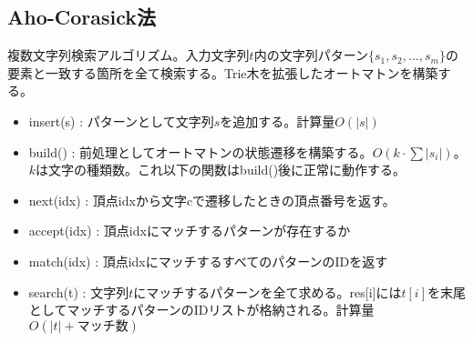 \subsection{Aho-Corasick法}

複数文字列検索アルゴリズム。入力文字列$t$内の文字列パターン$\{s_1, s_2, \ldots, s_m \}$の要素と一致する箇所を全て検索する。Trie木を拡張したオートマトンを構築する。

\begin{itemize}
    \item insert(s) : パターンとして文字列$s$を追加する。計算量$O(|s|)$
    \item build() : 前処理としてオートマトンの状態遷移を構築する。$O(k\cdot\sum{|s_i|})$。 $k$は文字の種類数。これ以下の関数はbuild()後に正常に動作する。
    \item next(idx) : 頂点idxから文字cで遷移したときの頂点番号を返す。
    \item accept(idx) : 頂点idxにマッチするパターンが存在するか
    \item match(idx) :  頂点idxにマッチするすべてのパターンのIDを返す
    \item search(t) : 文字列$t$にマッチするパターンを全て求める。{\ttfamily res[i]}には$t[i]$を末尾としてマッチするパターンのIDリストが格納される。計算量$O(|t|+マッチ数)$
\end{itemize}


